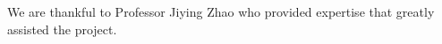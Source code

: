 \documentclass[../main.tex]{subfiles}
\begin{document}
We are thankful to Professor Jiying Zhao who provided expertise that greatly assisted the project.
\end{document}
